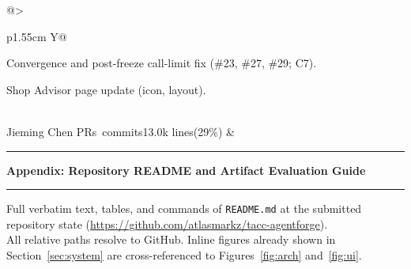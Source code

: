 \documentclass[10pt,letterpaper,twocolumn]{article}
\newcommand{\repo}{\url{https://github.com/atlasmarkz/tacc-agentforge}}
\begin{document}
\begin{table}[H]
\begin{tabularx}{\columnwidth}{@{}>{\raggedright\arraybackslash}p{1.55cm} Y@{}}
{\item Convergence and post-freeze call-limit fix (\#23, \#27, \#29; C7).
\item Shop Advisor page update (icon, layout).} \\[2pt]
Jieming Chen PRs~commits\newline 13.0k lines\newline (29\%) &  \\
\bottomrule
\end{tabularx}
\end{table}

\clearpage
\onecolumn
\appendix
{}
\setcounter{secnumdepth}{3}
\renewcommand{\thesection}{\Alph{section}}
\renewcommand{\thesubsection}{\thesection.\arabic{subsection}}
\renewcommand{\thesubsubsection}{\thesubsection.\arabic{subsubsection}}

\vspace*{-6pt}
\noindent\rule{\textwidth}{1.2pt}\par
\vspace{5pt}
\begin{center}
  {\fontsize{13.5}{16}\selectfont\bfseries Appendix: Repository README and Artifact Evaluation Guide}\par
\end{center}
\vspace{2pt}
\noindent\rule{\textwidth}{1.2pt}\par
\vspace{6pt}
\begin{center}
  {\footnotesize\color{SlateInk} Full verbatim text, tables, and commands of \texttt{README.md} at the submitted repository state (\repo).\\
  All relative paths resolve to GitHub. Inline figures already shown in Section~\ref{sec:system} are cross-referenced to Figures~\ref{fig:arch} and~\ref{fig:ui}.}
\end{center}
\vspace{4pt}
\end{document}
